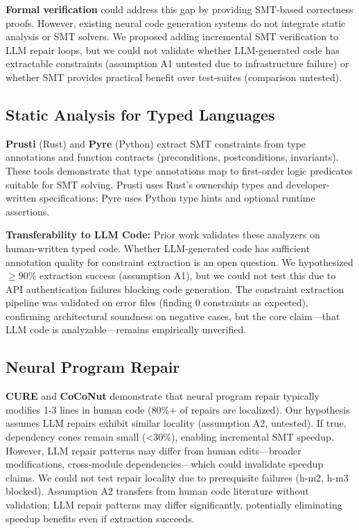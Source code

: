 \textbf{Formal verification} could address this gap by providing SMT-based correctness proofs. However, existing neural code generation systems do not integrate static analysis or SMT solvers. We proposed adding incremental SMT verification to LLM repair loops, but we could not validate whether LLM-generated code has extractable constraints (assumption A1 untested due to infrastructure failure) or whether SMT provides practical benefit over test-suites (comparison untested).

\subsection{Static Analysis for Typed Languages}

\textbf{Prusti} (Rust) and \textbf{Pyre} (Python) extract SMT constraints from type annotations and function contracts (preconditions, postconditions, invariants). These tools demonstrate that type annotations map to first-order logic predicates suitable for SMT solving. Prusti uses Rust's ownership types and developer-written specifications; Pyre uses Python type hints and optional runtime assertions.

\textbf{Transferability to LLM Code:} Prior work validates these analyzers on human-written typed code. Whether LLM-generated code has sufficient annotation quality for constraint extraction is an open question. We hypothesized $\geq$90\% extraction success (assumption A1), but we could not test this due to API authentication failures blocking code generation. The constraint extraction pipeline was validated on error files (finding 0 constraints as expected), confirming architectural soundness on negative cases, but the core claim---that LLM code is analyzable---remains empirically unverified.

\subsection{Neural Program Repair}

\textbf{CURE} and \textbf{CoCoNut} demonstrate that neural program repair typically modifies 1-3 lines in human code (80\%+ of repairs are localized). Our hypothesis assumes LLM repairs exhibit similar locality (assumption A2, untested). If true, dependency cones remain small (<30\%), enabling incremental SMT speedup. However, LLM repair patterns may differ from human edits---broader modifications, cross-module dependencies---which could invalidate speedup claims. We could not test repair locality due to prerequisite failures (h-m2, h-m3 blocked). Assumption A2 transfers from human code literature without validation; LLM repair patterns may differ significantly, potentially eliminating speedup benefits even if extraction succeeds.

